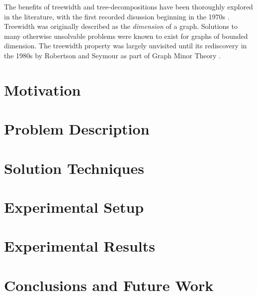 \documentclass[12pt,conference]{IEEEtran}
\begin{document}
The benefits of treewidth and tree-decompositions have been thoroughly explored in the literature, with the first recorded disussion beginning in the 1970s \cite{treewidth-original}. Treewidth was originally described as the \textit{dimension} of a graph. Solutions to many otherwise unsolvable problems were known to exist for graphs of bounded dimension. The treewidth property was largely unvisited until its rediscovery in the 1980s by Robertson and Seymour as part of Graph Minor Theory \cite{treewidth-rob-seymour}.

\section{Motivation}

\section{Problem Description}

\section{Solution Techniques}

\section{Experimental Setup}

\section{Experimental Results}

\section{Conclusions and Future Work}

\begin{thebibliography}{1}
\end{thebibliography}
\end{document}

